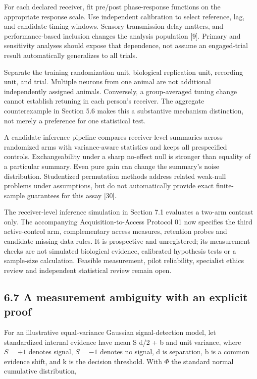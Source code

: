 \documentclass[
  american,
  11pt,
  letterpaper,
]{article}
\begin{document}
For each declared receiver, fit pre/post phase-response functions on the appropriate response scale. Use independent calibration to select reference, lag, and candidate timing windows. Sensory transmission delay matters, and performance-based inclusion changes the analysis population {[}9{]}. Primary and sensitivity analyses should expose that dependence, not assume an engaged-trial result automatically generalizes to all trials.

Separate the training randomization unit, biological replication unit, recording unit, and trial. Multiple neurons from one animal are not additional independently assigned animals. Conversely, a group-averaged tuning change cannot establish retuning in each person's receiver. The aggregate counterexample in Section 5.6 makes this a substantive mechanism distinction, not merely a preference for one statistical test.

A candidate inference pipeline compares receiver-level summaries across randomized arms with variance-aware statistics and keeps all prespecified controls. Exchangeability under a sharp no-effect null is stronger than equality of a particular summary. Even pure gain can change the summary's noise distribution. Studentized permutation methods address related weak-null problems under assumptions, but do not automatically provide exact finite-sample guarantees for this assay {[}30{]}.

The receiver-level inference simulation in Section 7.1 evaluates a two-arm contrast only. The accompanying Acquisition-to-Access Protocol 01 now specifies the third active-control arm, complementary access measures, retention probes and candidate missing-data rules. It is prospective and unregistered; its measurement checks are not simulated biological evidence, calibrated hypothesis tests or a sample-size calculation. Feasible measurement, pilot reliability, specialist ethics review and independent statistical review remain open.

\subsection{6.7 A measurement ambiguity with an explicit proof}\label{a-measurement-ambiguity-with-an-explicit-proof}

For an illustrative equal-variance Gaussian signal-detection model, let standardized internal evidence have mean S d/2 + b and unit variance, where \(S=+1\) denotes signal, \(S=-1\) denotes no signal, d is separation, b is a common evidence shift, and k is the decision threshold. With \(\Phi\) the standard normal cumulative distribution,
\end{document}
